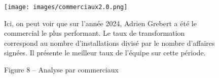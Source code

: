 \begin{figure}[H]
    \centering
    \texttt{[image: images/commerciaux2.0.png]}
    \caption*{Figure 8 – Analyse par commerciaux}\vspace{0.5em}

    \vspace{0.5em}
            {\small
           Ici, on peut voir que sur l’année 2024, Adrien Grebert a été le commercial le plus performant.
           Le taux de transformation correspond au nombre d’installations divisé par le nombre d’affaires signées.
           Il présente le meilleur taux de l’équipe sur cette période.

            }
\end{figure}


